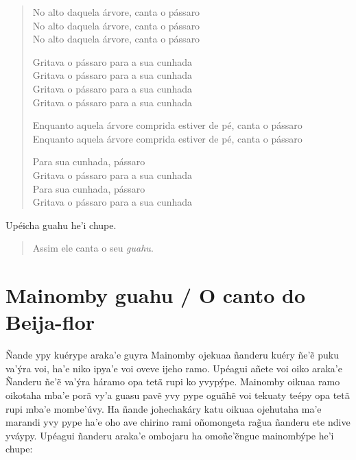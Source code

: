 \begin{verse}
No alto daquela árvore, canta o pássaro\\
No alto daquela árvore, canta o pássaro\\
No alto daquela árvore, canta o pássaro

Gritava o pássaro para a sua cunhada\\
Gritava o pássaro para a sua cunhada\\
Gritava o pássaro para a sua cunhada\\
Gritava o pássaro para a sua cunhada

Enquanto aquela árvore comprida estiver de pé, canta o pássaro\\
Enquanto aquela árvore comprida estiver de pé, canta o pássaro

Para sua cunhada, pássaro\\
Gritava o pássaro para a sua cunhada\\
Para sua cunhada, pássaro\\
Gritava o pássaro para a sua cunhada
\end{verse}

Upéicha guahu he'i chupe.

\begin{quote}
Assim ele canta o seu \emph{guahu}.
\end{quote}

\chapter{Mainomby guahu / O canto do Beija-flor}

Ñande ypy kuérype araka'e guyra Mainomby ojekuaa ñanderu kuéry ñe'ẽ puku
va'ýra voi, ha'e niko ipya'e voi oveve ijeho ramo. Upéagui añete voi
oiko araka'e Ñanderu ñe'ẽ va'ýra háramo opa tetã rupi ko yvypýpe.
Mainomby oikuaa ramo oikotaha mba'e porã vy'a guasu pavẽ yvy pype oguãhẽ
voi tekuaty teépy opa tetã rupi mba'e mombe'úvy. Ha ñande johechakáry
katu oikuaa ojehutaha ma'e marandi yvy pype ha'e oho ave chirino rami
oñomongeta rag̃ua ñanderu ete ndive yváypy. Upéagui ñanderu araka'e
ombojaru ha omoñe'ẽngue mainombýpe he'i chupe:

